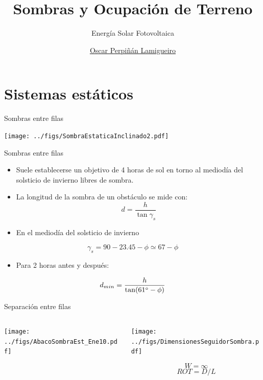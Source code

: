\documentclass[aspectratio=169, usenames,svgnames,dvipsnames]{beamer}
\author{\href{https://oscarperpinan.github.io}{Oscar Perpiñán Lamigueiro}}
\date{}
\title{Sombras y Ocupación de Terreno}
\subtitle{Energía Solar Fotovoltaica}
\institute[UPM]{Universidad Politécnica de Madrid}
\begin{document}
\maketitle

\section{Sistemas estáticos}
\label{sec:org8b879a5}

\begin{frame}[label={sec:orgeb75a69}]{Sombras entre filas}
\begin{center}
\texttt{[image: ../figs/SombraEstaticaInclinado2.pdf]}
\end{center}
\end{frame}

\begin{frame}[label={sec:orgc0602f6}]{Sombras entre filas}
\begin{itemize}
\item Suele establecerse un objetivo de \alert{4 horas de sol en torno al mediodía del solsticio de invierno libres de sombra}.

\item La longitud de la sombra de un obstáculo se mide con:$$d=\frac{h}{\tan\gamma_{s}}$$

\item En el mediodía del solsticio de invierno
\end{itemize}
$$\gamma_{s}=90-23.45-\phi\simeq67-\phi$$ 

\begin{itemize}
\item Para 2 horas antes y después:
\end{itemize}
$$d_{min}=\frac{h}{\tan(61\degree-\phi)}$$
\end{frame}
\begin{frame}[label={sec:orged44bcf}]{Separación entre filas}
\begin{columns}
\begin{column}{0.65\columnwidth}
\begin{center}
\texttt{[image: ../figs/AbacoSombraEst\_Ene10.pdf]}
\end{center}
\end{column}



\begin{column}{0.35\columnwidth}
\begin{center}
\texttt{[image: ../figs/DimensionesSeguidorSombra.pdf]}
\end{center}

\[
W=\infty\]
\[
  ROT=D/L
\]
\end{column}
\end{columns}
\end{frame}
\end{document}
